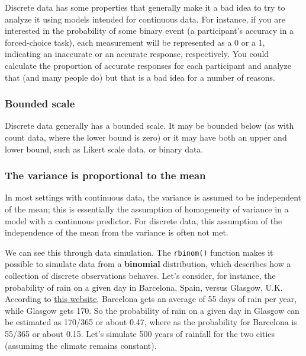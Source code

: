 \documentclass[]{book}
\begin{document}
Discrete data has some properties that generally make it a bad idea to try to analyze it using models intended for continuous data. For instance, if you are interested in the probability of some binary event (a participant's accuracy in a forced-choice task), each measurement will be represented as a 0 or a 1, indicating an inaccurate or an accurate response, respectively. You could calculate the proportion of accurate responses for each participant and analyze that (and many people do) but that is a bad idea for a number of reasons.

\hypertarget{bounded-scale}{%
\subsubsection{Bounded scale}\label{bounded-scale}}

Discrete data generally has a bounded scale. It may be bounded below (as with count data, where the lower bound is zero) or it may have both an upper and lower bound, such as Likert scale data. or binary data.

\hypertarget{the-variance-is-proportional-to-the-mean}{%
\subsubsection{The variance is proportional to the mean}\label{the-variance-is-proportional-to-the-mean}}

In most settings with continuous data, the variance is assumed to be independent of the mean; this is essentially the assumption of homogeneity of variance in a model with a continuous predictor. For discrete data, this assumption of the independence of the mean from the variance is often not met.

We can see this through data simulation. The \texttt{rbinom()} function makes it possible to simulate data from a \textbf{binomial} distribution, which describes how a collection of discrete observations behaves. Let's consider, for instance, the probability of rain on a given day in Barcelona, Spain, versus Glasgow, U.K. According to \href{https://www.currentresults.com/Weather/Europe/Cities/precipitation-annual-average.php}{this website}, Barcelona gets an average of 55 days of rain per year, while Glasgow gets 170. So the probability of rain on a given day in Glasgow can be estimated as 170/365 or about 0.47, where as the probability for Barcelona is 55/365 or about 0.15. Let's simulate 500 years of rainfall for the two cities (assumimg the climate remains constant).
\end{document}

